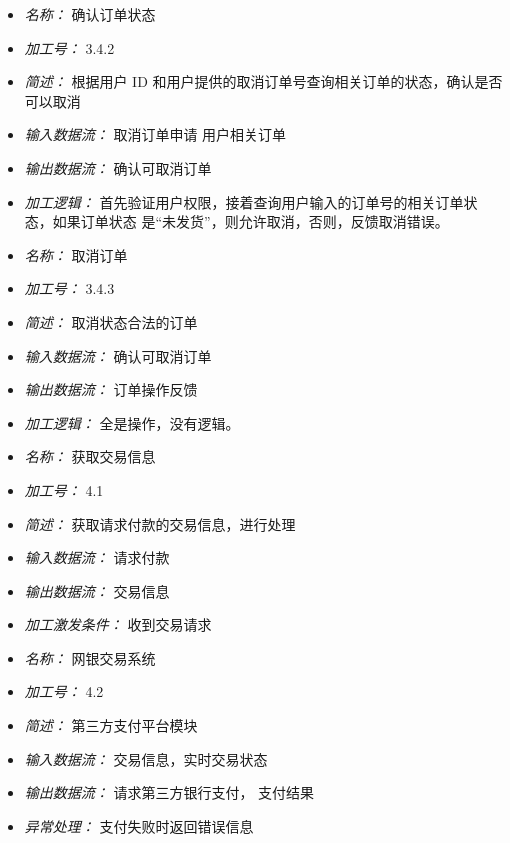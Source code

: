 \vspace{-1mm}


\begin{itemize}
\item \textit{名称： }确认订单状态
\item \textit{加工号： }3.4.2
\item \textit{简述： }根据用户 ID 和用户提供的取消订单号查询相关订单的状态，确认是否可以取消 
\item \textit{输入数据流： }取消订单申请 用户相关订单
\item \textit{输出数据流： }确认可取消订单 
\item \textit{加工逻辑： }首先验证用户权限，接着查询用户输入的订单号的相关订单状态，如果订单状态 是“未发货”，则允许取消，否则，反馈取消错误。

\end{itemize}


\vspace{-1mm}


\begin{itemize}
\item \textit{名称： }取消订单
\item \textit{加工号： }3.4.3 
\item \textit{简述： }取消状态合法的订单 
\item \textit{输入数据流： }确认可取消订单 
\item \textit{输出数据流： }订单操作反馈 
\item \textit{加工逻辑： }全是操作，没有逻辑。

\end{itemize}


\vspace{-1mm}


\begin{itemize}
\item \textit{名称： } 获取交易信息
\item \textit{加工号： } 4.1
\item \textit{简述： } 获取请求付款的交易信息，进行处理 
\item \textit{输入数据流： } 请求付款
\item \textit{输出数据流： } 交易信息
\item \textit{加工激发条件： } 收到交易请求

\end{itemize}


\vspace{-1mm}


\begin{itemize}
\item \textit{名称： } 网银交易系统
\item \textit{加工号： } 4.2
\item \textit{简述： } 第三方支付平台模块
\item \textit{输入数据流： } 交易信息，实时交易状态 
\item \textit{输出数据流： } 请求第三方银行支付， 支付结果 
\item \textit{异常处理： } 支付失败时返回错误信息

\end{itemize}


